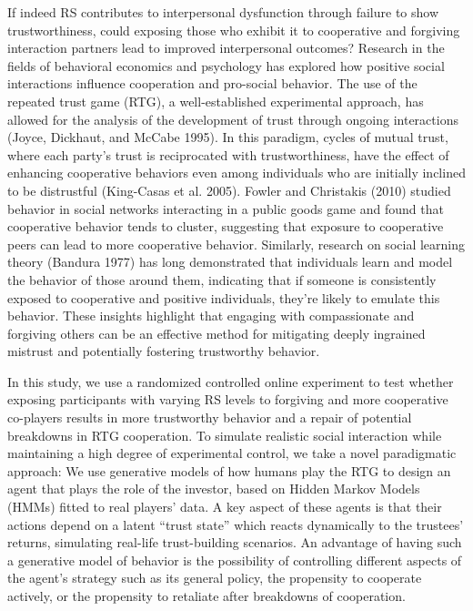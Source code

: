 \documentclass[
]{article}
\begin{document}
If indeed RS contributes to interpersonal dysfunction through failure to show trustworthiness, could exposing those who exhibit it to cooperative and forgiving interaction partners lead to improved interpersonal outcomes? Research in the fields of behavioral economics and psychology has explored how positive social interactions influence cooperation and pro-social behavior. The use of the repeated trust game (RTG), a well-established experimental approach, has allowed for the analysis of the development of trust through ongoing interactions (Joyce, Dickhaut, and McCabe 1995). In this paradigm, cycles of mutual trust, where each party's trust is reciprocated with trustworthiness, have the effect of enhancing cooperative behaviors even among individuals who are initially inclined to be distrustful (King-Casas et al. 2005). Fowler and Christakis (2010) studied behavior in social networks interacting in a public goods game and found that cooperative behavior tends to cluster, suggesting that exposure to cooperative peers can lead to more cooperative behavior. Similarly, research on social learning theory (Bandura 1977) has long demonstrated that individuals learn and model the behavior of those around them, indicating that if someone is consistently exposed to cooperative and positive individuals, they're likely to emulate this behavior. These insights highlight that engaging with compassionate and forgiving others can be an effective method for mitigating deeply ingrained mistrust and potentially fostering trustworthy behavior.

In this study, we use a randomized controlled online experiment to test whether exposing participants with varying RS levels to forgiving and more cooperative co-players results in more trustworthy behavior and a repair of potential breakdowns in RTG cooperation. To simulate realistic social interaction while maintaining a high degree of experimental control, we take a novel paradigmatic approach: We use generative models of how humans play the RTG to design an agent that plays the role of the investor, based on Hidden Markov Models (HMMs) fitted to real players' data. A key aspect of these agents is that their actions depend on a latent ``trust state'' which reacts dynamically to the trustees' returns, simulating real-life trust-building scenarios. An advantage of having such a generative model of behavior is the possibility of controlling different aspects of the agent's strategy such as its general policy, the propensity to cooperate actively, or the propensity to retaliate after breakdowns of cooperation.
\end{document}
